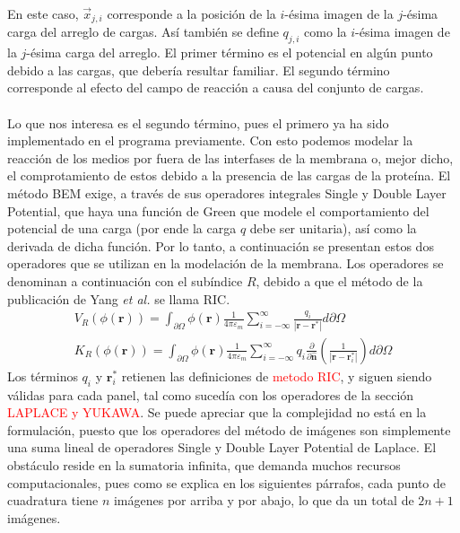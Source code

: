 \documentclass[12pt, notitlepage]{article}
\numberwithin{equation}{section}
\begin{document}
En este caso, $\vec{x}_{j,i}$ corresponde a la posición de la $i$-ésima imagen de la $j$-ésima carga del arreglo de cargas. Así también se define $q_{j,i}$ como la $i$-ésima imagen de la $j$-ésima carga del arreglo. El primer término es el potencial en algún punto debido a las cargas, que debería resultar familiar. El segundo término corresponde al efecto del campo de reacción a causa del conjunto de cargas.\\\\
Lo que nos interesa es el segundo término, pues el primero ya ha sido implementado en el programa previamente. Con esto podemos modelar la reacción de los medios por fuera de las interfases de la membrana o, mejor dicho, el comprotamiento de estos debido a la presencia de las cargas de la proteína. El método BEM exige, a través de sus operadores integrales Single y Double Layer Potential, que haya una función de Green que modele el comportamiento del potencial de una carga (por ende la carga $q$ debe ser unitaria), así como la derivada de dicha función. Por lo tanto, a continuación se presentan estos dos operadores que se utilizan en la modelación de la membrana. Los operadores se denominan a continuación con el subíndice $R$, debido a que el método de la publicación de Yang \textit{et al.} se llama RIC.
\begin{align}
V_R(\phi(\mathbf{r})) = \int_{\partial\Omega}\phi(\mathbf{r})\frac{1}{4\pi\varepsilon_m}\sum_{i=-\infty}^{\infty}\frac{q_i}{|\mathbf{r} - \mathbf{r}^*|}d\partial\Omega\\
K_R(\phi(\mathbf{r})) = \int_{\partial\Omega}\phi(\mathbf{r})\frac{1}{4\pi\varepsilon_m}\sum_{i=-\infty}^{\infty}q_i\frac{\partial}{\partial\hat{\mathbf{n}}}\left(\frac{1}{|\mathbf{r} - \mathbf{r}_i^*|}\right)d\partial\Omega
\end{align}
Los términos $q_i$ y $\mathbf{r}_i^*$ retienen las definiciones de \textcolor{red}{metodo RIC}, y siguen siendo válidas para cada panel, tal como sucedía con los operadores de la sección \textcolor{red}{LAPLACE y YUKAWA}. Se puede apreciar que la complejidad no está en la formulación, puesto que los operadores del método de imágenes son simplemente una suma lineal de operadores Single y Double Layer Potential de Laplace. El obstáculo reside en la sumatoria infinita, que demanda muchos recursos computacionales, pues como se explica en los siguientes párrafos, cada punto de cuadratura tiene $n$ imágenes por arriba y por abajo, lo que da un total de $2n + 1$ imágenes.
\end{document}
